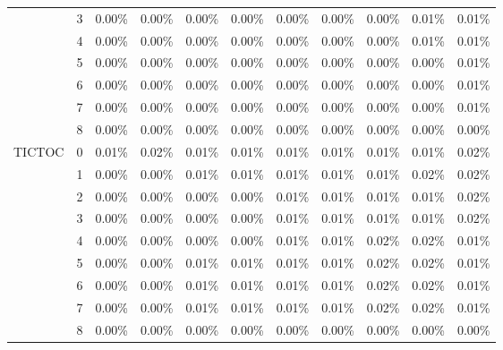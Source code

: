\begin{tabular}{llrrrrrrrrr}
       & 3 & 0.00\% & 0.00\% & 0.00\% & 0.00\% & 0.00\% & 0.00\% & 0.00\% & 0.01\% & 0.01\% \\
       & 4 & 0.00\% & 0.00\% & 0.00\% & 0.00\% & 0.00\% & 0.00\% & 0.00\% & 0.01\% & 0.01\% \\
       & 5 & 0.00\% & 0.00\% & 0.00\% & 0.00\% & 0.00\% & 0.00\% & 0.00\% & 0.00\% & 0.01\% \\
       & 6 & 0.00\% & 0.00\% & 0.00\% & 0.00\% & 0.00\% & 0.00\% & 0.00\% & 0.00\% & 0.01\% \\
       & 7 & 0.00\% & 0.00\% & 0.00\% & 0.00\% & 0.00\% & 0.00\% & 0.00\% & 0.00\% & 0.01\% \\
       & 8 & 0.00\% & 0.00\% & 0.00\% & 0.00\% & 0.00\% & 0.00\% & 0.00\% & 0.00\% & 0.00\% \\
TICTOC & 0 & 0.01\% & 0.02\% & 0.01\% & 0.01\% & 0.01\% & 0.01\% & 0.01\% & 0.01\% & 0.02\% \\
       & 1 & 0.00\% & 0.00\% & 0.01\% & 0.01\% & 0.01\% & 0.01\% & 0.01\% & 0.02\% & 0.02\% \\
       & 2 & 0.00\% & 0.00\% & 0.00\% & 0.00\% & 0.01\% & 0.01\% & 0.01\% & 0.01\% & 0.02\% \\
       & 3 & 0.00\% & 0.00\% & 0.00\% & 0.00\% & 0.01\% & 0.01\% & 0.01\% & 0.01\% & 0.02\% \\
       & 4 & 0.00\% & 0.00\% & 0.00\% & 0.00\% & 0.01\% & 0.01\% & 0.02\% & 0.02\% & 0.01\% \\
       & 5 & 0.00\% & 0.00\% & 0.01\% & 0.01\% & 0.01\% & 0.01\% & 0.02\% & 0.02\% & 0.01\% \\
       & 6 & 0.00\% & 0.00\% & 0.01\% & 0.01\% & 0.01\% & 0.01\% & 0.02\% & 0.02\% & 0.01\% \\
       & 7 & 0.00\% & 0.00\% & 0.01\% & 0.01\% & 0.01\% & 0.01\% & 0.02\% & 0.02\% & 0.01\% \\
       & 8 & 0.00\% & 0.00\% & 0.00\% & 0.00\% & 0.00\% & 0.00\% & 0.00\% & 0.00\% & 0.00\% \\
\bottomrule
\end{tabular}
